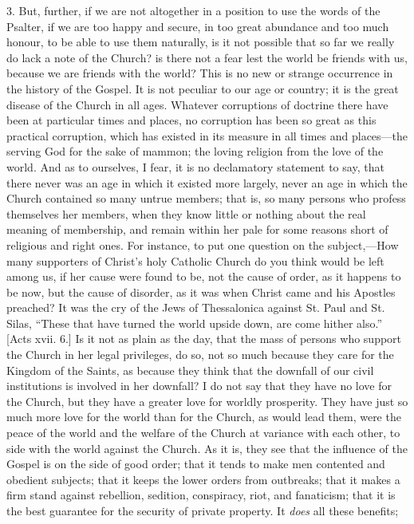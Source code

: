 3. But, further, if we are not altogether in a position to use the
words of the Psalter, if we are too happy and secure, in too great
abundance and too much honour, to be able to use them naturally, is it
not possible that so far we really do lack a note of the Church? is
there not a fear lest the world be friends with us, because we are
friends with the world? This is no new or strange occurrence in the
history of the Gospel. It is not peculiar to our age or country; it is
the great disease of the Church in all ages. Whatever corruptions of
doctrine there have been at particular times and places, no corruption
has been so great as this practical corruption, which has existed in
its measure in all times and places—the serving God for the sake of
mammon; the loving religion from the love of the world. And as to
ourselves, I fear, it is no declamatory statement to say, that there
never was an age in which it existed more largely, never an age in
which the Church contained so many untrue members; that is, so many
persons who profess themselves her members, when they know little or
nothing about the real meaning of membership, and remain within her
pale for some reasons short of religious and right ones. For instance,
to put one question on the subject,—How many supporters of Christ's
holy Catholic Church do you think would be left among us, if her cause
were found to be, not the cause of order, as it happens to be now, but
the cause of disorder, as it was when Christ came and his Apostles
preached? It was the cry of the Jews of Thessalonica against St. Paul
and St. Silas, ``These that have turned the world upside down, are
come hither also.'' [Acts xvii. 6.] Is it not as plain as the day,
that the mass of persons who support the Church in her legal
privileges, do so, not so much because they care for the Kingdom of
the Saints, as because they think that the downfall of our civil
institutions is involved in her downfall? I do not say that they have
no love for the Church, but they have a greater love for worldly
prosperity. They have just so much more love for the world than for
the Church, as would lead them, were the peace of the world and the
welfare of the Church at variance with each other, to side with the
world against the Church. As it is, they see that the influence of the
Gospel is on the side of good order; that it tends to make men
contented and obedient subjects; that it keeps the lower orders from
outbreaks; that it makes a firm stand against rebellion, sedition,
conspiracy, riot, and fanaticism; that it is the best guarantee for
the security of private property. It \emph{does} all these benefits;
